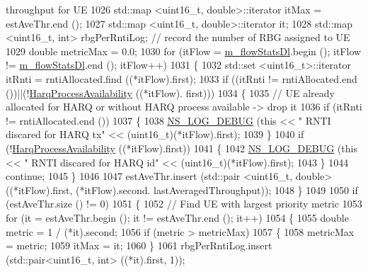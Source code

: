 \begin{DoxyCode}
{       throughput for UE}
1026   std::map <uint16\_t, double>::iterator itMax = estAveThr.end ();
1027   std::map <uint16\_t, double>::iterator it;
1028   std::map <uint16\_t, int> rbgPerRntiLog;                               \textcolor{comment}{// record the number of RBG
       assigned to UE}
1029   \textcolor{keywordtype}{double} metricMax = 0.0;
1030   \textcolor{keywordflow}{for} (itFlow = \hyperlink{classns3_1_1FdBetFfMacScheduler_a347c3f4c314a6791eef27d768927392a}{m\_flowStatsDl}.begin (); itFlow != \hyperlink{classns3_1_1FdBetFfMacScheduler_a347c3f4c314a6791eef27d768927392a}{m\_flowStatsDl}.end (); itFlow++)
1031     \{
1032       std::set <uint16\_t>::iterator itRnti = rntiAllocated.find ((*itFlow).first);
1033       \textcolor{keywordflow}{if} ((itRnti != rntiAllocated.end ())||(!\hyperlink{classns3_1_1FdBetFfMacScheduler_a8eb562f21b18eac9972a42599531c337}{HarqProcessAvailability} ((*itFlow).
      first)))
1034         \{
1035           \textcolor{comment}{// UE already allocated for HARQ or without HARQ process available -> drop it}
1036           \textcolor{keywordflow}{if} (itRnti != rntiAllocated.end ())
1037             \{
1038               \hyperlink{group__logging_ga413f1886406d49f59a6a0a89b77b4d0a}{NS\_LOG\_DEBUG} (\textcolor{keyword}{this} << \textcolor{stringliteral}{" RNTI discared for HARQ tx"} << (uint16\_t)(*itFlow).first);
1039             \}
1040           \textcolor{keywordflow}{if} (!\hyperlink{classns3_1_1FdBetFfMacScheduler_a8eb562f21b18eac9972a42599531c337}{HarqProcessAvailability} ((*itFlow).first))
1041             \{
1042               \hyperlink{group__logging_ga413f1886406d49f59a6a0a89b77b4d0a}{NS\_LOG\_DEBUG} (\textcolor{keyword}{this} << \textcolor{stringliteral}{" RNTI discared for HARQ id"} << (uint16\_t)(*itFlow).first);
1043             \}
1044           \textcolor{keywordflow}{continue};
1045         \}
1046 
1047       estAveThr.insert (std::pair <uint16\_t, double> ((*itFlow).first, (*itFlow).second.
      lastAveragedThroughput));
1048     \}
1049  
1050   \textcolor{keywordflow}{if} (estAveThr.size () != 0)
1051     \{
1052       \textcolor{comment}{// Find UE with largest priority metric}
1053       \textcolor{keywordflow}{for} (it = estAveThr.begin (); it != estAveThr.end (); it++)
1054         \{
1055           \textcolor{keywordtype}{double} metric =  1 / (*it).second;
1056           \textcolor{keywordflow}{if} (metric > metricMax)
1057             \{
1058               metricMax = metric;
1059               itMax = it;
1060             \}
1061           rbgPerRntiLog.insert (std::pair<uint16\_t, int> ((*it).first, 1));

\end{DoxyCode}
